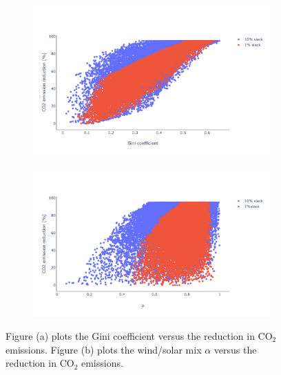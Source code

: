 \begin{figure}[h]\centering
	\begin{subfigure}{1\textwidth}
		\includegraphics[width=.9\textwidth,trim={0 0.8cm 0 2.5cm},clip]{./Images/corelation_gini_co2}
		\caption{}
		\label{fig:gini_co2}
	\end{subfigure}%
	\vspace{-.5cm}
	\begin{subfigure}{1\textwidth}
		\includegraphics[width=1\textwidth,trim={0 0.8cm 0 2.5cm},clip]{./Images/corelation_mix_co2}
		\caption{}
		\label{fig:mix_co2}
	\end{subfigure}%
	\label{fig:derivative_correlations}
	\caption{Figure (a) plots the Gini coefficient versus the reduction in $\text{CO}_2$ emissions. Figure (b) plots the wind/solar mix $\alpha$ versus the reduction in $\text{CO}_2$ emissions.}
\end{figure}

